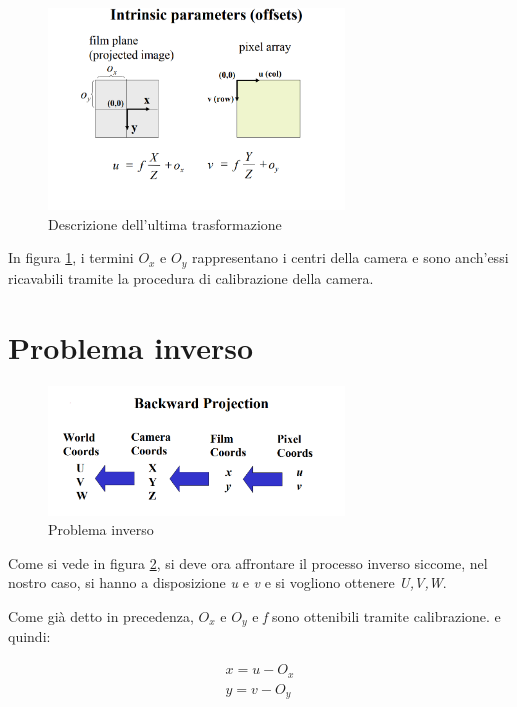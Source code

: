 \begin{figure}[H]
	\centering
	\includegraphics[width=0.7\textwidth]{Immagini/intrinsic_parameters.png}
	\caption{Descrizione dell'ultima trasformazione}
	\label{fig:intrinsic_parameters}
\end{figure}
In figura \ref{fig:intrinsic_parameters}, i termini $ O_{x}$ e $ O_{y} $ rappresentano i centri della camera e sono anch'essi ricavabili tramite la procedura di calibrazione della camera.

\section{Problema inverso}
\begin{figure}[H]
	\centering
	\includegraphics[width=0.7\textwidth]{Immagini/backward.png}
	\caption{Problema inverso}
	\label{fig:backward}
\end{figure}

Come si vede in figura \ref{fig:backward}, si deve ora affrontare il processo inverso siccome, nel nostro caso, si hanno a disposizione \textit{u} e \textit{v} e si vogliono ottenere \textit{U,V,W}.

Come già detto in precedenza, $ O_{x}$ e $ O_{y} $ e \textit{f} sono ottenibili tramite calibrazione. e quindi:

\begin{equation}
\begin{split}
x = u -O_{x}\\
y = v -O_{y}
\end{split}
\end{equation}

